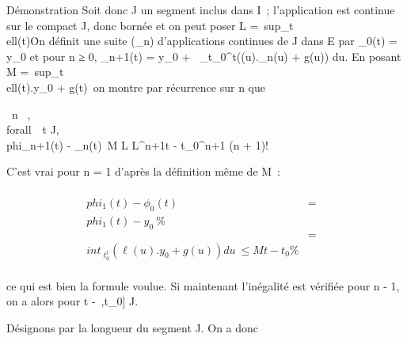 Démonstration Soit donc J un segment inclus dans I~; l'application \ell est
continue sur le compact J, donc bornée et on peut poser L
=\
sup_t\inJ\\ell(t)\.
On définit une suite (\phi_n) d'applications continues de J dans E
par \phi_0(t) = y_0 et pour n ≥ 0, \phi_n+1(t) =
y_0 +\int ~
_t_0^t\left (\ell(u).\phi_n(u)
+ g(u)\right ) du. En posant M
=\
sup_t\inJ\\ell(t).y_0 +
g(t)\, on montre par récurrence sur n que

\forall~n \in {}~, \\forall~~t \in J,
\\phi_n+1(t) -
\phi_n(t)\ \leq M \over L
 L^n+1t - t_0^n+1
\over (n + 1)!

C'est vrai pour n = 1 d'après la définition même de M~:

\begin{align*}
\\phi_1(t) -
\phi_0(t)& =&
\\phi_1(t) -
y_0\ \%&
\\ & =&
\\int ~
_t_0^t(\ell(u).y_ 0 + g(u))
du\ \leq Mt - t_0\%&
\\ \end{align*}

ce qui est bien la formule voulue. Si maintenant l'inégalité est
vérifiée pour n - 1, on a alors pour t \in [t_0,+\infty~[\bigcapJ

\begin{align*}
\\phi_n+1(t) -
\phi_n(t)& =&
\\int ~
_t_0^t\left (\ell(u).\phi_ n(u)
- \ell(u).\phi_n-1(u))\right )
du\\%
\int ~
_t_0^t\\ell(u)\.\\phi_
n(u) - \phi_n-1(u)\ du \%&
\\ & \leq& \int ~
_t_0^tL\\phi_ n(u)
- \phi_n-1(u)\ du \%&
\\ & \leq& L\int ~
_t_0^t M \over L 
L^nu - t_0^n
\over n! du \%& \\ &
=& M \over L  L^n+1t -
t_0^n+1 \over (n + 1)!
\%& \\ \end{align*}

Un calcul similaire conduit à la même inégalité pour t \in]
-\infty~,t_0] \bigcap J.

Désignons par \eta la longueur du segment J. On a donc

